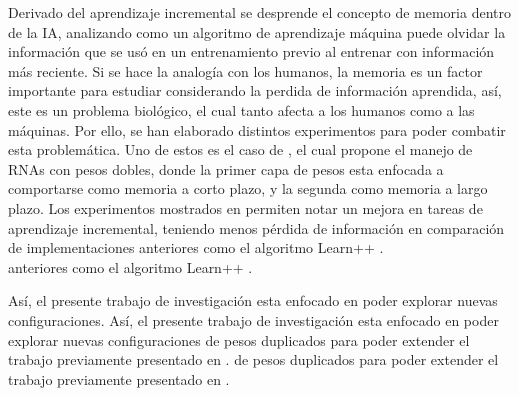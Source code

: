   Derivado del aprendizaje incremental se desprende el concepto de memoria dentro de la IA, analizando como un algoritmo de aprendizaje máquina puede olvidar la información que se usó en un entrenamiento previo al entrenar con información más reciente. Si se hace la analogía con los humanos, la memoria es un factor importante para estudiar considerando la perdida de información aprendida, así, este es un problema biológico, el cual tanto afecta a los humanos como a las máquinas. Por ello, se han elaborado distintos experimentos para poder combatir esta problemática. Uno de estos es el caso de \cite{bullinaria2009}, el cual propone el manejo de RNAs con pesos dobles, donde la primer capa de pesos esta enfocada a comportarse como memoria a corto plazo, y la segunda como memoria a largo plazo.  Los experimentos mostrados en \cite{bullinaria2009} permiten notar un mejora en tareas de aprendizaje incremental, teniendo menos pérdida de información en comparación de implementaciones anteriores como el algoritmo  Learn++ \cite{li2008, Elwell2011}.\\ anteriores como el algoritmo  Learn++ \cite{li2008, Elwell2011}.
    
  Así, el presente trabajo de investigación esta enfocado en poder explorar nuevas configuraciones. Así, el presente trabajo de investigación esta enfocado en poder explorar nuevas configuraciones de pesos duplicados para poder extender el trabajo previamente presentado en \cite{bullinaria2009}.   de pesos duplicados para poder extender el trabajo previamente presentado en \cite{bullinaria2009}. 